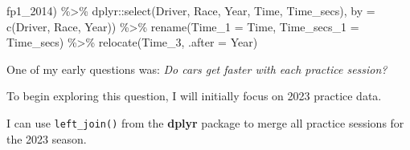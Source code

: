 \documentclass[
]{book}
\newenvironment{Shaded}{\begin{snugshade}}{\end{snugshade}}
\newcommand{\AttributeTok}[1]{\textcolor[rgb]{0.77,0.63,0.00}{#1}}
\newcommand{\FunctionTok}[1]{\textcolor[rgb]{0.00,0.00,0.00}{#1}}
\newcommand{\NormalTok}[1]{#1}
\newcommand{\SpecialCharTok}[1]{\textcolor[rgb]{0.00,0.00,0.00}{#1}}
\newcommand{\StringTok}[1]{\textcolor[rgb]{0.31,0.60,0.02}{#1}}
\begin{document}
\begin{Shaded}
\begin{Highlighting}[]
\NormalTok{                            fp1\_2014) }\SpecialCharTok{\%\textgreater{}\%}
\NormalTok{              dplyr}\SpecialCharTok{::}\FunctionTok{select}\NormalTok{(}\StringTok{\textquotesingle{}Driver\textquotesingle{}}\NormalTok{, }\StringTok{\textquotesingle{}Race\textquotesingle{}}\NormalTok{, }\StringTok{\textquotesingle{}Year\textquotesingle{}}\NormalTok{, }\StringTok{\textquotesingle{}Time\textquotesingle{}}\NormalTok{, }\StringTok{\textquotesingle{}Time\_secs\textquotesingle{}}\NormalTok{), }\AttributeTok{by =} \FunctionTok{c}\NormalTok{(}\StringTok{\textquotesingle{}Driver\textquotesingle{}}\NormalTok{, }\StringTok{\textquotesingle{}Race\textquotesingle{}}\NormalTok{, }\StringTok{\textquotesingle{}Year\textquotesingle{}}\NormalTok{)) }\SpecialCharTok{\%\textgreater{}\%}
  \FunctionTok{rename}\NormalTok{(}\AttributeTok{Time\_1 =}\NormalTok{ Time, }\AttributeTok{Time\_secs\_1 =}\NormalTok{ Time\_secs) }\SpecialCharTok{\%\textgreater{}\%} 
  \FunctionTok{relocate}\NormalTok{(Time\_3, }\AttributeTok{.after =}\NormalTok{ Year)}
\end{Highlighting}
\end{Shaded}

One of my early questions was: \emph{Do cars get faster with each practice session?}

To begin exploring this question, I will initially focus on 2023 practice data.

I can use \texttt{left\_join()} from the \textbf{dplyr} package to merge all practice sessions for the 2023 season.
\end{document}
